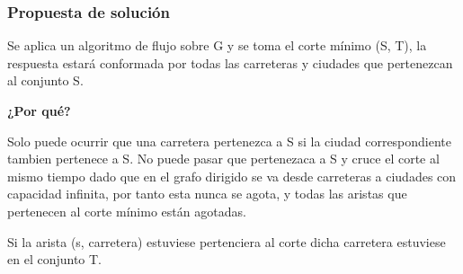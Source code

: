 \documentclass[10pt]{article} %
\begin{document}
%	
%	
%	
%	
	
	\subsubsection{Propuesta de soluci\'on}
	
	Se aplica un algoritmo de flujo sobre G y se toma el corte m\'inimo (S, T), la respuesta estar\'a conformada por todas las carreteras y ciudades que pertenezcan al conjunto S. 
	
	\textbf{¿Por qu\'e? }
	
	Solo puede ocurrir que una carretera pertenezca a S si la ciudad correspondiente tambien pertenece a S. No puede pasar que pertenezaca a S y cruce el corte al mismo tiempo dado que en el grafo dirigido se va desde carreteras a ciudades con capacidad infinita, por tanto esta nunca se agota, y todas las aristas que pertenecen al corte m\'inimo est\'an agotadas. 
	
	Si la arista (s, carretera) estuviese pertenciera al corte dicha carretera estuviese en el conjunto T. 
	
\end{document}

